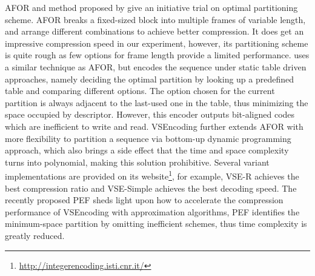 \documentclass[runningheads,a4paper]{llncs}
\begin{document}
AFOR and method proposed by \cite{anh2004index} give an initiative trial on optimal partitioning scheme.
AFOR breaks a fixed-sized block into multiple frames of variable length, and arrange different combinations to achieve better compression.
It does get an impressive compression speed in our experiment, however, its partitioning scheme is quite rough as few options for frame length provide a limited performance.
\cite{anh2004index} uses a similar technique as AFOR, but encodes the sequence under static table driven approaches, namely deciding the optimal partition by looking up a predefined table and comparing different options.
The option chosen for the current partition is always adjacent to the last-used one in the table, thus minimizing the space occupied by descriptor.
However, this encoder outputs bit-aligned codes which are inefficient to write and read.
VSEncoding further extends AFOR with more flexibility to partition a sequence via bottom-up dynamic programming approach, which also brings a side effect that the time and space complexity turns into polynomial, making this solution prohibitive.
Several variant implementations are provided on its website\footnote{\url{http://integerencoding.isti.cnr.it/}}, for example, VSE-R achieves the best compression ratio and VSE-Simple achieves the best decoding speed.
The recently proposed PEF sheds light upon how to accelerate the compression performance of VSEncoding with approximation algorithms, PEF identifies the minimum-space partition by omitting inefficient schemes, thus time complexity is greatly reduced.
\end{document}
